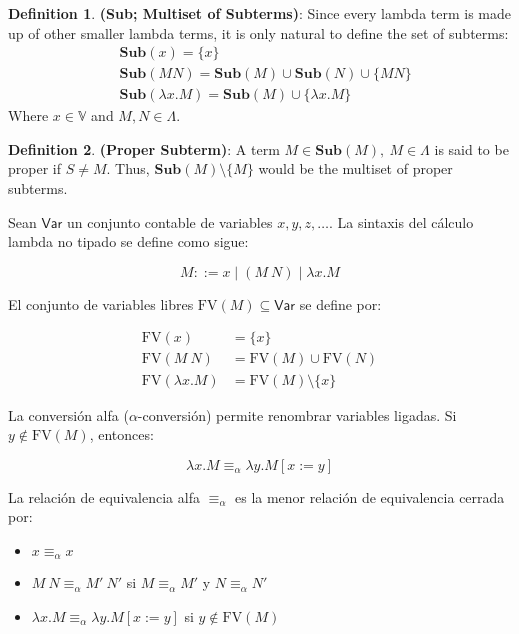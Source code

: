 \documentclass[12pt]{book}
\newcommand{\functionfont}[1]{\mathbf{#1}}
\newcommand{\Sub}[1]{\functionfont{Sub}(#1)}
\theoremstyle{plain}
\theoremstyle{definition}
\newtheorem{definition}{Definition}[section]
\theoremstyle{definition}
\theoremstyle{definition}
\begin{document}
\begin{definition} \textbf{(Sub; Multiset of Subterms)}: Since every lambda term is made up of other smaller lambda terms, it is only natural to define the set of subterms:
\begin{align*}
  &\Sub x = \{x\} \\
  &\Sub {MN} = \Sub M  \cup \Sub N \cup \{MN\} \\
  &\Sub {\lambda x . M} = \Sub M  \cup \{\lambda x. M\}
\end{align*}
Where $x \in \mathbb{V}$ and $M, N \in \Lambda $.
\end{definition}
\begin{definition} \textbf{(Proper Subterm)}: A term $M \in \Sub M, \ M \in \Lambda$ is said to be proper if $S \neq M$. Thus, $\Sub{M} \setminus \{M\}$ would be the multiset of proper subterms.
\end{definition}










\newpage

Sean \( \mathsf{Var} \) un conjunto contable de variables \( x, y, z, \ldots \). La sintaxis del cálculo lambda no tipado se define como sigue:

\[
M ::= x \mid (M\ N) \mid \lambda x. M
\]

El conjunto de variables libres \( \mathrm{FV}(M) \subseteq \mathsf{Var} \) se define por:

\begin{align*}
\mathrm{FV}(x) &= \{x\} \\
\mathrm{FV}(M\ N) &= \mathrm{FV}(M) \cup \mathrm{FV}(N) \\
\mathrm{FV}(\lambda x. M) &= \mathrm{FV}(M) \setminus \{x\}
\end{align*}

La conversión alfa (\( \alpha \)-conversión) permite renombrar variables ligadas. Si \( y \notin \mathrm{FV}(M) \), entonces:

\[
\lambda x. M \equiv_\alpha \lambda y. M[x := y]
\]

La relación de equivalencia alfa \( \equiv_\alpha \) es la menor relación de equivalencia cerrada por:

\begin{itemize}[label=--]
  \item \( x \equiv_\alpha x \)
  \item \( M\ N \equiv_\alpha M'\ N' \) si \( M \equiv_\alpha M' \) y \( N \equiv_\alpha N' \)
  \item \( \lambda x. M \equiv_\alpha \lambda y. M[x := y] \) si \( y \notin \mathrm{FV}(M) \)
\end{itemize}
\end{document}
